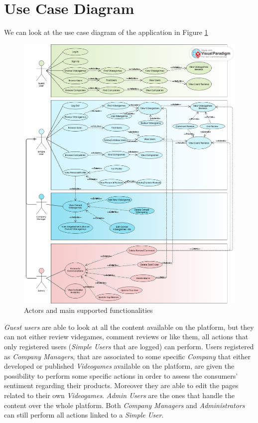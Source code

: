 \section{Use Case Diagram}
We can look at the use case diagram of the application in Figure \ref{fig:usecase}
\begin{figure}[hbt!]
	\centering
	\includegraphics[width=1\textwidth]{chapter3/img/usecase.jpg}
	\caption{Actors and main supported functionalities}
	\label{fig:usecase}
\end{figure}
\emph{Guest users} are able to look at all the content available on the platform, but they can not either review videgames, comment reviews or like them, all actions that only registered users (\emph{Simple Users} that are logged) can perform. 
Users registered as \emph{Company Managers}, that are associated to some specific \emph{Company} that either developed or published \emph{Videogames} available on the platform, are given the possibility to perform some specific actions in order to assess the consumers' sentiment regarding their products. Moreover they are able to edit the pages related to their own \emph{Videogames}. 
\emph{Admin Users} are the ones that handle the content over the whole platform. 
Both \emph{Company Managers} and \emph{Administrators} can still perform all actions linked to a \emph{Simple User}. 
